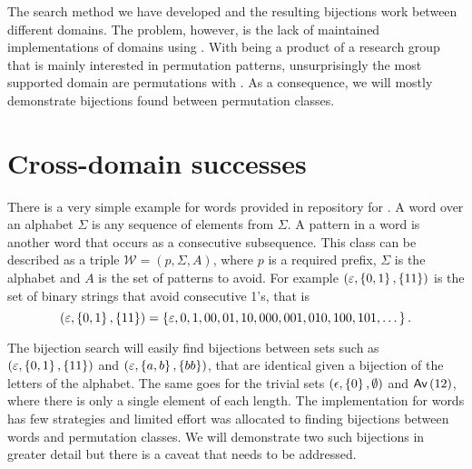 
\label{ch:results}
The search method we have developed and the resulting bijections work between different domains. The problem, however, is the lack of maintained implementations of domains using \css{}. With \css{} being a product of a research group that is mainly interested in permutation patterns, unsurprisingly the most supported domain are permutations with \tsc{}. As a consequence, we will mostly demonstrate bijections found between permutation classes.

\section{Cross-domain successes}
There is a very simple example for words provided in repository for \css{}. A word over an alphabet $\Sigma$ is any sequence of elements from $\Sigma$. A pattern in a word is another word that occurs as a consecutive subsequence. This class can be described as a triple $\mathcal{W} = (p, \Sigma, A)$, where $p$ is a required prefix, $\Sigma$ is the alphabet and $A$ is the set of patterns to avoid. For example $(\varepsilon, \left\{0,1\right\}, \left\{11\right\})$ is the set of binary strings that avoid consecutive 1's, that is
\[
    (\varepsilon, \left\{0,1\right\}, \left\{11\right\}) = \left\{\varepsilon, 0, 1, 00, 01, 10, 000, 001, 010, 100, 101, \dotsc\right\}.
\]


The bijection search will easily find bijections between sets such as $(\varepsilon, \left\{0,1\right\}, \left\{11\right\})$ and $(\varepsilon, \left\{a,b\right\}, \left\{bb\right\})$, that are identical given a bijection of the letters of the alphabet. The same goes for the trivial sets $(\epsilon, \left\{0\right\}, \emptyset)$ and $\textsf{Av}\left(12\right)$, where there is only a single element of each length. The implementation for words has few strategies and limited effort was allocated to finding bijections between words and permutation classes. We will demonstrate two such bijections in greater detail but there is a caveat that needs to be addressed.

